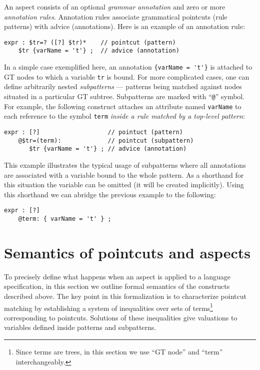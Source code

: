 \documentclass{IOS-Book-Article}     %
\begin{document}
An aspect consists of an optional \emph{grammar annotation} and zero or more \emph{annotation rules}. Annotation rules associate grammatical pointcuts (rule patterns) with advice (annotations). Here is an example of an annotation rule:
\begin{lstlisting}[language=Grammatic]
expr : $tr=? ([?] $tr)*    // pointcut (pattern)
    $tr {varName = 't'} ;  // advice (annotation)
\end{lstlisting}%
In a simple case exemplified here, an annotation \lstinline!{varName = 't'}! is attached to GT nodes to which a variable \texttt{tr} is bound.
For more complicated cases, one can define arbitrarily nested \emph{subpatterns} --- patterns being matched against nodes situated in a particular GT subtree. Subpatterns are marked with ``\lstinline!@!'' symbol. For example, the following construct attaches an attribute named \texttt{varName} to each reference to the symbol \texttt{term} \emph{inside a rule matched by a top-level pattern}:
\begin{lstlisting}[language=Grammatic]
expr : [?]                   // pointuct (pattern) 
    @$tr=(term):             // pointcut (subpattern)
       $tr {varName = 't'} ; // advice (annotation)
\end{lstlisting}
This example illustrates the typical usage of subpatterns where all annotations are associated with a variable bound to the whole pattern. As a shorthand for this situation the variable can be omitted (it will be created implicitly). Using this shorthand we can abridge the previous example to the following:
\begin{lstlisting}[language=Grammatic]
expr : [?]
    @term: { varName = 't' } ; 
\end{lstlisting}
%

\section{Semantics of pointcuts and aspects}

To precisely define what happens when an aspect is applied to a language specification, in this section we outline formal semantics of the constructs described above. The key point in this formalization is to characterize pointcut matching by establishing a system of inequalities over sets of terms\footnote{Since terms are trees, in this section we use ``GT node'' and ``term'' interchangeably.} corresponding to pointcuts. Solutions of these inequalities give valuations to variables defined inside patterns and subpatterns.
\end{document}
